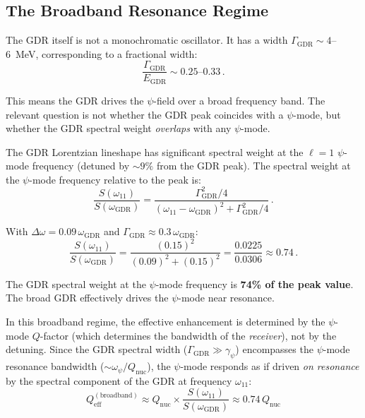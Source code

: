 \documentclass[aps,prd,twocolumn,superscriptaddress,nofootinbib]{revtex4-2}
\newcommand{\Qnuc}{Q_{\mathrm{nuc}}}
\newcommand{\wGDR}{\omega_{\mathrm{GDR}}}
\newcommand{\wpsi}{\omega_\psi}
\newcommand{\gpsi}{\gamma_\psi}
\newcommand{\EGDR}{E_{\mathrm{GDR}}}
\begin{document}
\subsection{The Broadband Resonance Regime}
\label{sec:broadband}

The GDR itself is not a monochromatic oscillator.  It has a width
$\Gamma_{\mathrm{GDR}} \sim 4$--6~MeV, corresponding to a fractional
width:
\begin{equation}
\frac{\Gamma_{\mathrm{GDR}}}{\EGDR} \sim 0.25\text{--}0.33\,.
\end{equation}

This means the GDR drives the $\psi$-field over a broad frequency
band.  The relevant question is not whether the GDR peak coincides
with a $\psi$-mode, but whether the GDR spectral weight \emph{overlaps}
with any $\psi$-mode.

The GDR Lorentzian lineshape has significant spectral weight at the
$\ell = 1$ $\psi$-mode frequency (detuned by $\sim\!9\%$ from the
GDR peak).  The spectral weight at the $\psi$-mode frequency
relative to the peak is:
\begin{equation}
\frac{S(\omega_{11})}{S(\wGDR)} =
\frac{\Gamma_{\mathrm{GDR}}^2/4}
{(\omega_{11} - \wGDR)^2 + \Gamma_{\mathrm{GDR}}^2/4}\,.
\end{equation}

With $\Delta\omega = 0.09\,\wGDR$ and $\Gamma_{\mathrm{GDR}}
\approx 0.3\,\wGDR$:
\begin{equation}
\frac{S(\omega_{11})}{S(\wGDR)} =
\frac{(0.15)^2}{(0.09)^2 + (0.15)^2}
= \frac{0.0225}{0.0306} \approx 0.74\,.
\end{equation}

The GDR spectral weight at the $\psi$-mode frequency is
\textbf{74\% of the peak value}.  The broad GDR effectively
drives the $\psi$-mode near resonance.

In this broadband regime, the effective enhancement is determined by
the $\psi$-mode $Q$-factor (which determines the bandwidth of the
\emph{receiver}), not by the detuning.  Since the GDR spectral
width ($\Gamma_{\mathrm{GDR}} \gg \gpsi$) encompasses the
$\psi$-mode resonance bandwidth ($\sim\wpsi/\Qnuc$), the $\psi$-mode
responds as if driven \emph{on resonance} by the spectral component
of the GDR at frequency $\omega_{11}$:
\begin{equation}\label{eq:broadband-Q}
\boxed{
Q_{\mathrm{eff}}^{(\mathrm{broadband})} \approx
\Qnuc \times \frac{S(\omega_{11})}{S(\wGDR)}
\approx 0.74\,\Qnuc
}
\end{equation}
\end{document}
